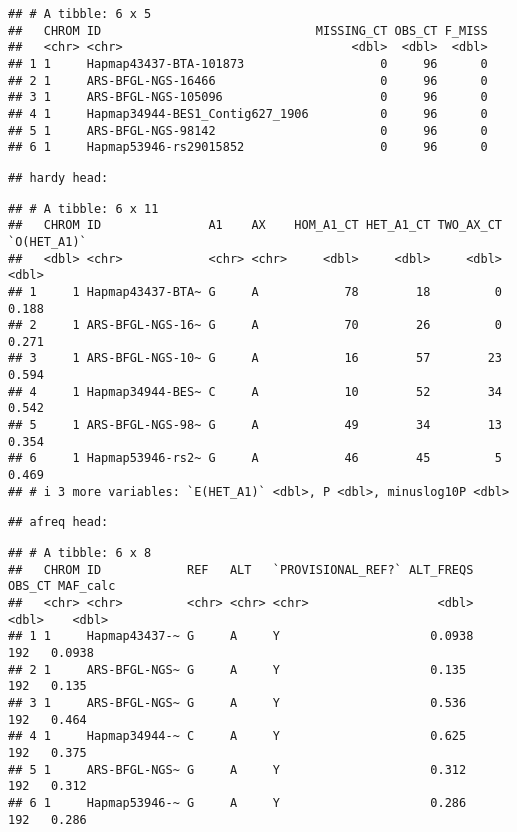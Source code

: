 \documentclass[
]{article}
\begin{document}
\begin{verbatim}
## # A tibble: 6 x 5
##   CHROM ID                              MISSING_CT OBS_CT F_MISS
##   <chr> <chr>                                <dbl>  <dbl>  <dbl>
## 1 1     Hapmap43437-BTA-101873                   0     96      0
## 2 1     ARS-BFGL-NGS-16466                       0     96      0
## 3 1     ARS-BFGL-NGS-105096                      0     96      0
## 4 1     Hapmap34944-BES1_Contig627_1906          0     96      0
## 5 1     ARS-BFGL-NGS-98142                       0     96      0
## 6 1     Hapmap53946-rs29015852                   0     96      0
\end{verbatim}

\begin{verbatim}
## hardy head:
\end{verbatim}

\begin{verbatim}
## # A tibble: 6 x 11
##   CHROM ID               A1    AX    HOM_A1_CT HET_A1_CT TWO_AX_CT `O(HET_A1)`
##   <dbl> <chr>            <chr> <chr>     <dbl>     <dbl>     <dbl>       <dbl>
## 1     1 Hapmap43437-BTA~ G     A            78        18         0       0.188
## 2     1 ARS-BFGL-NGS-16~ G     A            70        26         0       0.271
## 3     1 ARS-BFGL-NGS-10~ G     A            16        57        23       0.594
## 4     1 Hapmap34944-BES~ C     A            10        52        34       0.542
## 5     1 ARS-BFGL-NGS-98~ G     A            49        34        13       0.354
## 6     1 Hapmap53946-rs2~ G     A            46        45         5       0.469
## # i 3 more variables: `E(HET_A1)` <dbl>, P <dbl>, minuslog10P <dbl>
\end{verbatim}

\begin{verbatim}
## afreq head:
\end{verbatim}

\begin{verbatim}
## # A tibble: 6 x 8
##   CHROM ID            REF   ALT   `PROVISIONAL_REF?` ALT_FREQS OBS_CT MAF_calc
##   <chr> <chr>         <chr> <chr> <chr>                  <dbl>  <dbl>    <dbl>
## 1 1     Hapmap43437-~ G     A     Y                     0.0938    192   0.0938
## 2 1     ARS-BFGL-NGS~ G     A     Y                     0.135     192   0.135 
## 3 1     ARS-BFGL-NGS~ G     A     Y                     0.536     192   0.464 
## 4 1     Hapmap34944-~ C     A     Y                     0.625     192   0.375 
## 5 1     ARS-BFGL-NGS~ G     A     Y                     0.312     192   0.312 
## 6 1     Hapmap53946-~ G     A     Y                     0.286     192   0.286
\end{verbatim}
\end{document}
